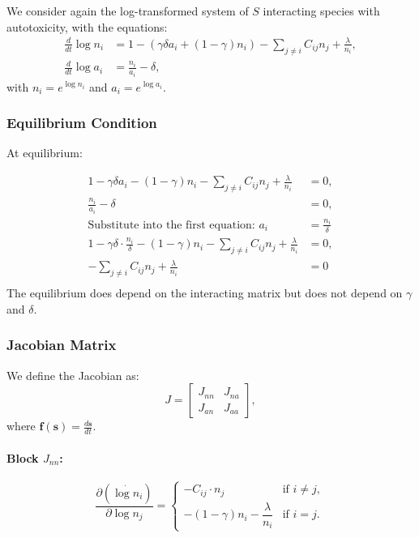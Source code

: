 \documentclass{article}
\begin{document}
We consider again the log-transformed system of $S$ interacting species with autotoxicity, with the equations:
\begin{align}
\frac{d}{dt} \log n_i &= 1 - \left( \gamma \delta a_i + (1 - \gamma) n_i \right) - \sum_{j \ne i} C_{ij} n_j + \frac{\lambda}{n_i}, \\
\frac{d}{dt} \log a_i &= \frac{n_i}{a_i} - \delta,
\end{align}
with $n_i = e^{\log n_i}$ and $a_i = e^{\log a_i}$.

\subsubsection{Equilibrium Condition}

At equilibrium:

\[
\begin{aligned}
1 - \gamma \delta a_i - (1 - \gamma) n_i - \sum_{j \ne i} C_{ij} n_j + \frac{\lambda}{n_i} &= 0, \\
\frac{n_i}{a_i} - \delta &= 0, \\
\text{Substitute into the first equation: } 
a_i &= \frac{n_i}{\delta}\\
1 - \gamma \delta \cdot \frac{n_i}{\delta} - (1 - \gamma) n_i - \sum_{j \ne i} C_{ij} n_j + \frac{\lambda}{n_i} &= 0, \\
- \sum_{j \ne i} C_{ij} n_j + \frac{\lambda}{n_i} &= 0 \\
\end{aligned}
\]
The equilibrium does depend on the interacting matrix but does not depend on $\gamma$ and $\delta$.
\subsubsection{Jacobian Matrix}

We define the Jacobian as:
\[
J =
\begin{bmatrix}
J_{nn} & J_{na} \\
J_{an} & J_{aa}
\end{bmatrix},
\]
where $\bm{f}(\bm{s}) = \frac{d\bm{s}}{dt}$.

\paragraph{Block $J_{nn}$:}
\[
\frac{\partial (\dot{\log n_i})}{\partial \log n_j} =
\begin{cases}
- C_{ij} \cdot n_j & \text{if } i \ne j, \\
- (1 - \gamma) n_i - \dfrac{\lambda}{n_i} & \text{if } i = j.
\end{cases}
\]
\end{document}
